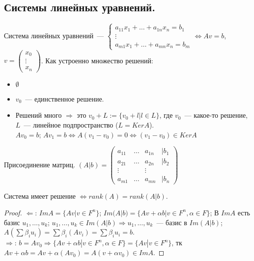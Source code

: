 \documentclass{article}
\begin{document}
	\subsection{Системы линейных уравнений.}
	\begin{definition}
		Система линейных уравнений~--- $
		\begin{cases}
			a_{11}x_1 + \dots + a_{1n}x_n = b_1 \\
			\vdots \\
			a_{m1}x_1 + \dots + a_{mn}x_n = b_m
		\end{cases}
		\Leftrightarrow Av = b$, $v =
		\left( \begin{smallmatrix}
			x_0 \\
			\vdots \\
			x_n
		\end{smallmatrix} \right)
		$. Как устроенно множество решений:
		\begin{itemize}
			\item $\emptyset$
			\item $v_0$~--- единственное решение.
			\item Решений много $\Rightarrow$ это $v_0 + L := \{ v_0 + l | l \in L \}$, где $v_0$~--- какое-то решение, $L$~--- линейное подпространство ($L = Ker A$). \\
			$Av_0 = b$; $Av_1 = b \Leftrightarrow A(v_1 - v_0) = 0 \Leftrightarrow (v_1 - v_0) \in Ker A$
		\end{itemize}
	\end{definition}
	\begin{definition}
		Присоединение матриц. $(A | b) = 
		\left( \begin{smallmatrix}
			a_{11} & \dots & a_{1n} & | b_1 \\
			a_{21} & \dots & a_{2n} & | b_2 \\
			\vdots &  & \vdots \\
			a_{m1} & \dots & a_{mn} & | b_n
		\end{smallmatrix} \right)
		$
	\end{definition}
	\begin{theorem}
		Система имеет решение $\Leftrightarrow rank(A) = rank(A|b)$.
	\end{theorem}
	\begin{proof}
		$\Leftarrow$: $ImA = \{ Av | v \in F^n \}$; $Im(A | b) = \{ Av + \alpha b | v \in F^n, \alpha \in F \}$; В $ImA$ есть базис $u_1, \dots, u_k$; $u_1, \dots, u_k \in Im(A | b) \Rightarrow u_1, \dots, u_k$~--- базис в $Im(A | b)$; $A(\sum \beta_i u_i) = \sum \beta_i (Av_i) = \sum \beta_i u_i = b$. \\
		$\Rightarrow$: $b = Av_0 \Rightarrow \{ Av + \alpha b | v \in F^n, \alpha \in F \} = \{ Av | v \in F^n \}$, тк $Av + \alpha b = Av + \alpha (Av_0) = A(v + \alpha v_0) \in ImA$.
	\end{proof}
\end{document}
